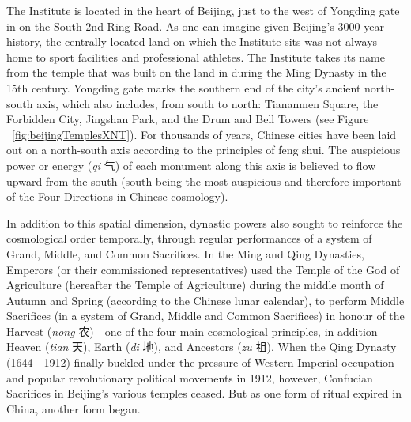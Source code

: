 \begin{CJK}{UTF8}{gbsn}
The Institute is located in the heart of Beijing, just to the west of Yongding gate in on the South 2nd Ring Road. As one can imagine given Beijing's 3000-year history, the centrally located land on which the Institute sits was not always home to sport facilities and professional athletes.  The Institute takes its name from the temple that was built on the land in during the Ming Dynasty in the 15th century.  Yongding gate marks the southern end of the city's ancient north-south axis, which also includes, from south to north: Tiananmen Square, the Forbidden City, Jingshan Park, and the Drum and Bell Towers (see Figure ~\ref{fig:beijingTemplesXNT}).  For thousands of years, Chinese cities have been laid out on a north-south axis according to the principles of feng shui. The auspicious power or energy (\textit{qi} 气) of each monument along this axis is believed to flow upward from the south (south being the most auspicious and therefore important of the Four Directions in Chinese cosmology).

In addition to this spatial dimension, dynastic powers also sought to reinforce the cosmological order temporally, through regular performances of a system of Grand, Middle, and Common Sacrifices.  In the Ming and Qing Dynasties, Emperors (or their commissioned representatives) used the Temple of the God of Agriculture (hereafter the Temple of Agriculture) during the middle month of Autumn and Spring (according to the Chinese lunar calendar), to perform Middle Sacrifices (in a system of Grand, Middle and Common Sacrifices) in honour of the Harvest (\textit{nong} 农)---one of the four main cosmological principles, in addition Heaven (\textit{tian} 天), Earth (\textit{di} 地), and Ancestors (\textit{zu} 祖)\citep[98]{Brownell2008}.  When the Qing Dynasty (1644---1912) finally buckled under the pressure of Western Imperial occupation and popular revolutionary political movements in 1912, however, Confucian Sacrifices in Beijing's various temples ceased.  But as one form of ritual expired in China, another form began.


\end{CJK}
